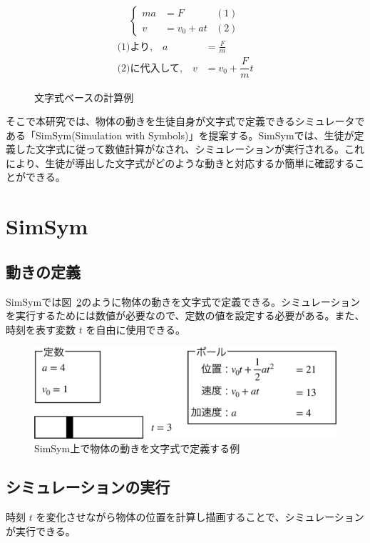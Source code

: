 \documentclass[11pt, a4paper, oneside, twocolumn]{jsarticle}
\newcommand{\simname}{SimSym}
\newcommand{\simnamealt}{Simulation with Symbols}
\begin{document}
\begin{figure}[hbt]
\begin{align}
  \left\{
  \begin{aligned}
    ma &= F & (1)\\
    v &= v_0 + at & (2)
  \end{aligned}
  \right. \nonumber
\end{align}
\begin{align}
  \text{(1)より,}\quad a &= \frac{F}{m} \nonumber\\
  \text{(2)に代入して,}\quad v &= v_0 + \dfrac{F}{m}t \nonumber
\end{align}
\caption{文字式ベースの計算例} \label{symbol_based}
\end{figure}

そこで本研究では、物体の動きを生徒自身が文字式で定義できるシミュレータである「\simname (\simnamealt)」を提案する。\simname では、生徒が定義した文字式に従って数値計算がなされ、シミュレーションが実行される。これにより、生徒が導出した文字式がどのような動きと対応するか簡単に確認することができる。

\section{\simname}
\subsection*{動きの定義}
\simname では図~\ref{simsym_fig1}のように物体の動きを文字式で定義できる。シミュレーションを実行するためには数値が必要なので、定数の値を設定する必要がある。また、時刻を表す変数 $t$ を自由に使用できる。

\begin{figure}[htb]
  \centering
  \includegraphics*[width=0.9\linewidth]{work/slide_img1-crop.pdf}
  \caption{\simname 上で物体の動きを文字式で定義する例} \label{simsym_fig1}
\end{figure}

\subsection*{シミュレーションの実行}
時刻 $t$ を変化させながら物体の位置を計算し描画することで、シミュレーションが実行できる。
\end{document}
